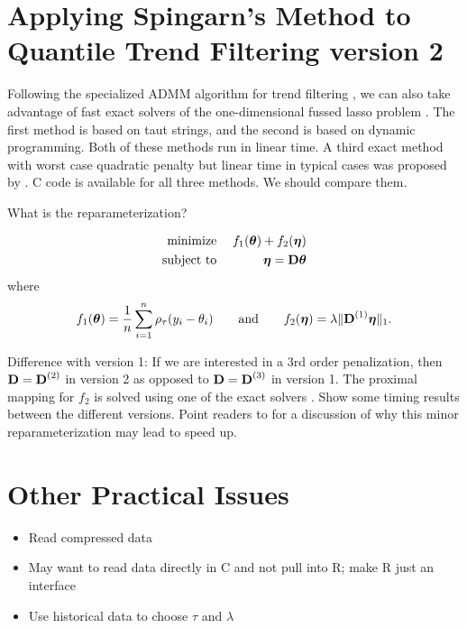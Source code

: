 \documentclass[12pt]{article}
\numberwithin{equation}{section}
\theoremstyle{plain}
\newcommand{\V}[1]{{\bm{\mathbf{\MakeLowercase{#1}}}}} %
\newcommand{\VE}[2]{\MakeLowercase{#1}_{#2}} %
\newcommand{\M}[1]{{\bm{\mathbf{\MakeUppercase{#1}}}}} %
\newcommand{\Mn}[2]{\M{#1}^{(#2)}} %
\begin{document}
\section{Applying Spingarn's Method to Quantile Trend Filtering version 2}

Following the specialized ADMM algorithm for trend filtering \citep{Ramdas2016}, we can also take advantage of fast exact solvers of the one-dimensional fussed lasso problem \citep{davies2001, Johnson2013}. The first method is based on taut strings, and the second is based on dynamic programming. Both of these methods run in linear time. A third exact method with worst case quadratic penalty but linear time in typical cases was proposed by \cite{Condat2013}. C code is available for all three methods. We should compare them.

What is the reparameterization?

\begin{eqnarray*}
\text{minimize}\; && f_1(\V{\theta}) + f_2(\V{\eta}) \\
\text{subject to}\; && \V{\eta} = \M{D}\V{\theta}
\end{eqnarray*}
where
\begin{eqnarray*}
f_1(\V{\theta}) = \frac{1}{n}\sum_{i=1}^n \rho_\tau(\VE{y}{i} - \VE{\theta}{i}) \quad\quad \text{and} \quad\quad
f_2(\V{\eta}) = \lambda\lVert \Mn{D}{1}\V{\eta} \rVert_1.
\end{eqnarray*}

Difference with version 1: If we are interested in a 3rd order penalization, then $\M{D} = \Mn{D}{2}$ in version 2 as opposed to $\M{D} = \Mn{D}{3}$ in version 1. The proximal mapping for $f_2$ is solved using one of the exact solvers \citep{davies2001, Johnson2013, Condat2013}. Show some timing results between the different versions. Point readers to \cite{Ramdas2016} for a discussion of why this minor reparameterization may lead to speed up.

\section{Other Practical Issues}

\begin{itemize}
	\item Read compressed data
	\item May want to read data directly in C and not pull into R; make R just an interface
	\item Use historical data to choose $\tau$ and $\lambda$
\end{itemize}
\end{document}
